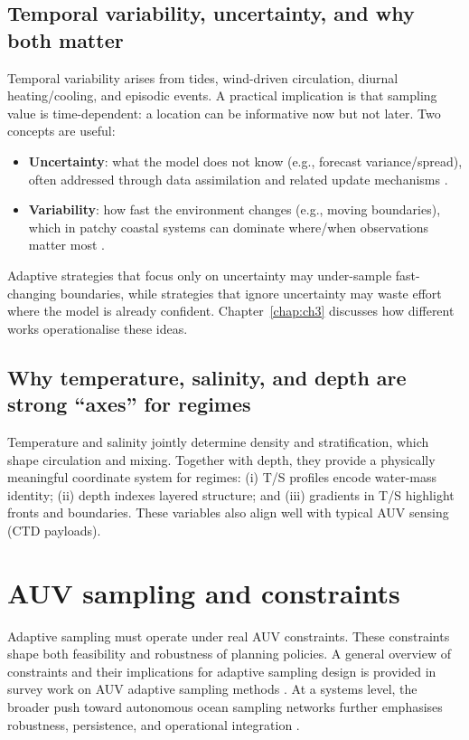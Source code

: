 \subsection{Temporal variability, uncertainty, and why both matter}
Temporal variability arises from tides, wind-driven circulation, diurnal heating/cooling, and episodic
events. A practical implication is that sampling value is time-dependent: a location can be informative
now but not later. Two concepts are useful:

\begin{itemize}
  \item \textbf{Uncertainty}: what the model does not know (e.g., forecast variance/spread), often addressed through
  data assimilation and related update mechanisms \parencite{dowd2014dataassimilation}.
  \item \textbf{Variability}: how fast the environment changes (e.g., moving boundaries), which in patchy coastal
  systems can dominate where/when observations matter most \parencite{martin2003patchiness}.
\end{itemize}

Adaptive strategies that focus only on uncertainty may under-sample fast-changing boundaries,
while strategies that ignore uncertainty may waste effort where the model is already confident.
Chapter~\ref{chap:ch3} discusses how different works operationalise these ideas.

\subsection{Why temperature, salinity, and depth are strong ``axes'' for regimes}
Temperature and salinity jointly determine density and stratification, which shape circulation and mixing.
Together with depth, they provide a physically meaningful coordinate system for regimes:
(i) T/S profiles encode water-mass identity; (ii) depth indexes layered structure; and (iii) gradients
in T/S highlight fronts and boundaries. These variables also align well with typical AUV sensing (CTD payloads).

\section{AUV sampling and constraints} \label{sec:auv_constraints}

Adaptive sampling must operate under real AUV constraints. These constraints shape both feasibility
and robustness of planning policies. A general overview of constraints and their implications for
adaptive sampling design is provided in survey work on AUV adaptive sampling methods
\parencite{hwang2019auvreview}. At a systems level, the broader push toward autonomous ocean sampling
networks further emphasises robustness, persistence, and operational integration \parencite{curtin2009aosn}.

